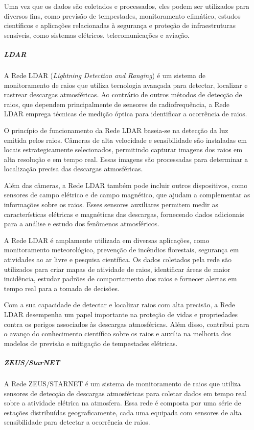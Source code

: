 \documentclass[a4paper, 12pt, onecolumn,singlespacing]{article}
\begin{document}
	Uma vez que os dados são coletados e processados, eles podem ser utilizados para diversos fins, como previsão de tempestades, monitoramento climático, estudos científicos e aplicações relacionadas à segurança e proteção de infraestruturas sensíveis, como sistemas elétricos, telecomunicações e aviação.
	
	\subparagraph{LDAR}
	
	A Rede LDAR (\textit{Lightning Detection and Ranging}) é um sistema de monitoramento de raios que utiliza tecnologia avançada para detectar, localizar e rastrear descargas atmosféricas. Ao contrário de outros métodos de detecção de raios, que dependem principalmente de sensores de radiofrequência, a Rede LDAR emprega técnicas de medição óptica para identificar a ocorrência de raios.
	
	O princípio de funcionamento da Rede LDAR baseia-se na detecção da luz emitida pelos raios. Câmeras de alta velocidade e sensibilidade são instaladas em locais estrategicamente selecionados, permitindo capturar imagens dos raios em alta resolução e em tempo real. Essas imagens são processadas para determinar a localização precisa das descargas atmosféricas.
	
	Além das câmeras, a Rede LDAR também pode incluir outros dispositivos, como sensores de campo elétrico e de campo magnético, que ajudam a complementar as informações sobre os raios. Esses sensores auxiliares permitem medir as características elétricas e magnéticas das descargas, fornecendo dados adicionais para a análise e estudo dos fenômenos atmosféricos.
	
	A Rede LDAR é amplamente utilizada em diversas aplicações, como monitoramento meteorológico, prevenção de incêndios florestais, segurança em atividades ao ar livre e pesquisa científica. Os dados coletados pela rede são utilizados para criar mapas de atividade de raios, identificar áreas de maior incidência, estudar padrões de comportamento dos raios e fornecer alertas em tempo real para a tomada de decisões.
	
	Com a sua capacidade de detectar e localizar raios com alta precisão, a Rede LDAR desempenha um papel importante na proteção de vidas e propriedades contra os perigos associados às descargas atmosféricas. Além disso, contribui para o avanço do conhecimento científico sobre os raios e auxilia na melhoria dos modelos de previsão e mitigação de tempestades elétricas.
	
	\subparagraph{ZEUS/StarNET}
	
	A Rede ZEUS/STARNET é um sistema de monitoramento de raios que utiliza sensores de detecção de descargas atmosféricas para coletar dados em tempo real sobre a atividade elétrica na atmosfera. Essa rede é composta por uma série de estações distribuídas geograficamente, cada uma equipada com sensores de alta sensibilidade para detectar a ocorrência de raios.
	
\end{document}
